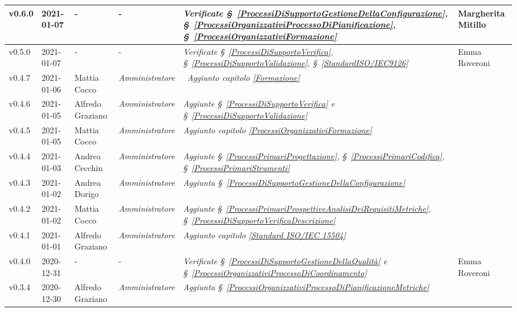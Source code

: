 {\begin{center}
\begin{longtable}[c]{|p{2cm-1\tabcolsep}|p{2cm}|p{3cm-2\tabcolsep}|p{3cm-1.5\tabcolsep}|p{}|p{3cm-2\tabcolsep}|}
		\hline
		\centering v0.6.0 & 2021-01-07 & \centering - & \centering -  & \textit{Verificate  \S~\ref{ProcessiDiSupportoGestioneDellaConfigurazione}, \S~\ref{ProcessiOrganizzativiProcessoDiPianificazione}, \S~\ref{ProcessiOrganizzativiFormazione}} & Margherita Mitillo \\
		\hline
		\centering v0.5.0 & 2021-01-07 & \centering - & \centering -  & \textit{Verificate \S~\ref{ProcessiDiSupportoVerifica}, \S~\ref{ProcessiDiSupportoValidazione}, \S~\ref{StandardISO/IEC9126}} & Emma Roveroni \\
		\hline
		\centering v0.4.7 & 2021-01-06 & Mattia Cocco & \centering \textit{Amministratore}  & \	\textit{Aggiunto capitolo \ref{Formazione}} & \makecell[c]{-} \\
		\hline
		\centering v0.4.6 & 2021-01-05 & Alfredo Graziano & \centering \textit{Amministratore} &  \textit{Aggiunte  \S~\ref{ProcessiDiSupportoVerifica} e \S~\ref{ProcessiDiSupportoValidazione} } & \makecell[c]{-} \\
		\hline
		\centering v0.4.5 & 2021-01-05 & Mattia Cocco & \centering \textit{Amministratore}  & \textit{Aggiunto capitolo \ref{ProcessiOrganizzativiFormazione}}  & \makecell[c]{-}\\
		\hline
		\centering v0.4.4 & 2021-01-03 & Andrea Cecchin & \centering \textit{Amministratore} &  \textit{Aggiunte  \S~\ref{ProcessiPrimariProgettazione}, \S~\ref{ProcessiPrimariCodifica}, \S~\ref{ProcessiPrimariStrumenti}}  & \makecell[c]{-}\\
		\hline
		\centering v0.4.3 & 2021-01-02 & Andrea Dorigo & \centering \textit{Amministratore}  & \textit{Aggiunta  \S~\ref{ProcessiDiSupportoGestioneDellaConfigurazione}} & \makecell[c]{-}\\
		\hline
		\centering v0.4.2 & 2021-01-02 & Mattia Cocco & \centering \textit{Amministratore}  & \textit{Aggiunte  \S~\ref{ProcessiPrimariProspettiveAnalisiDeiRequisitiMetriche}, \S~\ref{ProcessiDiSupportoVerificaDescrizione}}  & \makecell[c]{-}\\
		\hline
		\centering v0.4.1 & 2021-01-01 & Alfredo Graziano & \centering \textit{Amministratore}  & \textit{Aggiunto capitolo \ref{Standard ISO/IEC 15504}} &\makecell[c]{-} \\
		\hline
		\centering v0.4.0 & 2020-12-31 & \centering - & \centering -  & \textit{Verificate  \S~\ref{ProcessiDiSupportoGestioneDellaQualità} e \S~\ref{ProcessiOrganizzativiProcessoDiCoordinamento} } & Emma Roveroni \\
		\hline
		\centering v0.3.4 & 2020-12-30 & Alfredo Graziano & \centering \textit{Amministratore} &  \textit{Aggiunta  \S~\ref{ProcessiOrganizzativiProcessoDiPianificazioneMetriche}} & \makecell[c]{-} \\

\end{longtable}
\end{center}}
